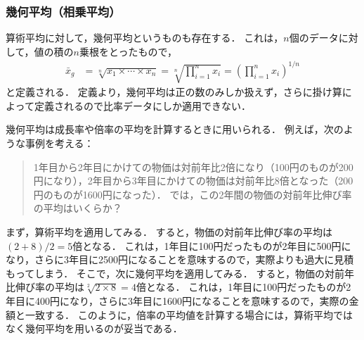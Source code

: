 
\subsubsection*{幾何平均（相乗平均）}
%
算術平均に対して，幾何平均というものも存在する．
%
これは，$ n $個のデータに対して，値の積の$ n $乗根をとったもので，
%
\begin{align}
	\bar{x}_{g} &= \sqrt[n]{x_{1}\times\cdots \times x_{n}} = \sqrt[n]{\prod_{i=1}^{n}x_{i}} = \left(\prod_{i=1}^{n}x_{i}\right)^{1/n}
	\label{eq:geometric_mean}
\end{align}
%
と定義される．
%
定義より，幾何平均は正の数のみしか扱えず，さらに掛け算によって定義されるので比率データにしか適用できない．
%

%
幾何平均は成長率や倍率の平均を計算するときに用いられる．
%
例えば，次のような事例を考える：
%
\begin{quotation}
1年目から2年目にかけての物価は対前年比2倍になり（100円のものが200円になり），2年目から3年目にかけての物価は対前年比8倍となった（200円のものが1600円になった）．
では，この2年間の物価の対前年比伸び率の平均はいくらか？
\end{quotation}
%
まず，算術平均を適用してみる．
%
すると，物価の対前年比伸び率の平均は$ (2+8)/2=5 $倍となる．
%
これは，1年目に100円だったものが2年目に500円になり，さらに3年目に2500円になることを意味するので，実際よりも過大に見積もってしまう．
%
そこで，次に幾何平均を適用してみる．
%
すると，物価の対前年比伸び率の平均は$ \sqrt[2]{2\times 8}=4 $倍となる．
%
これは，1年目に100円だったものが2年目に400円になり，さらに3年目に1600円になることを意味するので，実際の金額と一致する．
%
このように，倍率の平均値を計算する場合には，算術平均ではなく幾何平均を用いるのが妥当である．
%

